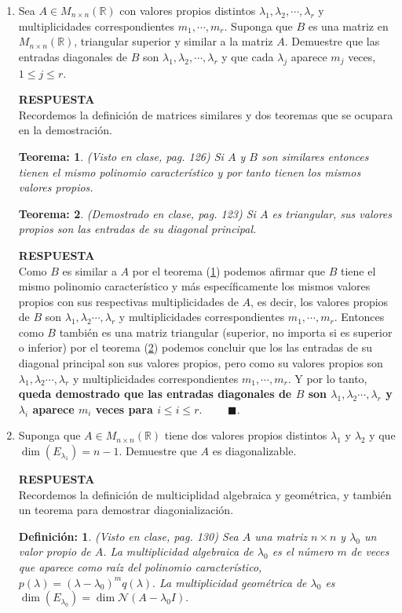 \documentclass[11pt,letterpaper]{article}
\newcommand{\mR}{\mathbb{R}}
\newcommand{\mcN}{\mathcal{N}}
\newcommand{\res}{\textbf{RESPUESTA}\\}
\newcommand{\fin}{$\blacksquare.$}
\newtheorem{thmt}{Teorema:}
\newtheorem{thmd}{Definición:}
\begin{document}
\begin{enumerate}
\item Sea $A\in M_{n\times n}(\mR)$ con valores propios distintos $\lambda_1, \lambda_2, \cdots, \lambda_r$ y multiplicidades correspondientes $m_1, \cdots, m_r$. Suponga que $B$ es una matriz en $M_{n\times n}(\mR)$, triangular superior y similar a la matriz $A$. Demuestre que las entradas diagonales de $B$ son $\lambda_1, \lambda_2,\cdots, \lambda_r$  y que cada $\lambda_j$ aparece $m_j$ veces, $1\leq j \leq r$.

\res Recordemos la definición de matrices similares y dos teoremas que se ocupara en la demostración.
\begin{framed}
    \begin{thmt} \label{t_similar}
	(Visto en clase, pag. 126) Si $A$ y $B$ son similares entonces tienen el mismo polinomio característico y por tanto tienen los mismos valores propios.
    \end{thmt}
\end{framed}
\begin{framed}
    \begin{thmt} \label{t_triangular_diagonal}
	(Demostrado en clase, pag. 123) Si $A$ es triangular, sus valores propios son las entradas de su diagonal principal.
    \end{thmt}
\end{framed}
\res Como $B$ es similar a $A$ por el teorema  (\ref{t_similar}) podemos afirmar que $B$ tiene el mismo polinomio característico y más específicamente los mismos valores propios con sus respectivas multiplicidades de $A$, es decir, los valores propios de $B$ son $\lambda_1, \lambda_2\cdots , \lambda_r$ y multiplicidades correspondientes $m_1,\cdots, m_r$.  Entonces como $B$ también es una matriz triangular (superior, no importa si es superior o inferior) por el teorema (\ref{t_triangular_diagonal}) podemos concluir que los las entradas de su diagonal principal son sus valores propios, pero como su valores propios son $\lambda_1, \lambda_2\cdots , \lambda_r$ y multiplicidades correspondientes $m_1,\cdots, m_r$. Y por lo tanto, \textbf{queda demostrado que las entradas diagonales de $B$ son $\lambda_1, \lambda_2\cdots , \lambda_r$ y $\lambda_i$ aparece  $m_i$ veces para $i\leq i \leq r.$} \ \ \ \ \fin

\item Suponga que $A\in M_{n\times n}(\mR)$ tiene dos valores propios distintos $\lambda_1$ y $\lambda_2$ y que $\dim(E_{\lambda_1})=n-1$. Demuestre que $A$ es diagonalizable. 

\res Recordemos la definición de multiciplidad algebraica y geométrica, y también un teorema para demostrar diagonialización. 
\begin{framed}
    \begin{thmd} \label{d_multiplicidad}
	(Visto en clase, pag. 130) Sea $A$ una matriz $n\times n$ y $\lambda_0$ un valor propio de $A$. La multiplicidad algebraica de $\lambda_0$ es el número $m$ de veces que aparece como raíz del polinomio característico, $p(\lambda)=(\lambda-\lambda_0)^m q(\lambda).$ La multiplicidad geométrica de $\lambda_0$ es $\dim(E_{\lambda_0})=\dim \mcN(A-\lambda_0 I).$ \\
	

\end{thmd}
\end{framed}
\end{enumerate}
\end{document}
